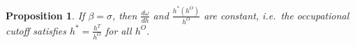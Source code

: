 \documentclass[onehalfspacing,11pt]{article}
\newtheorem{prp}{Proposition}
\begin{document}
%
%
\begin{prp}
If $\beta = \sigma$, then $\frac{d\omega}{dh}$ and $\frac{h^*(h^O)}{h^O}$ are constant, i.e.~the occupational cutoff satisfies $h^* = \frac{h^T}{h^O}$ for all $h^O$.
\end{prp}
\end{document}
